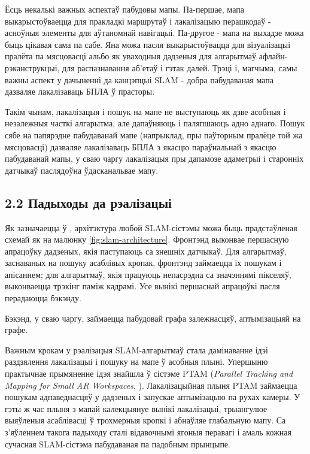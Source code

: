 Ёсць некалькі важных аспектаў пабудовы мапы. Па-першае, мапа выкарыстоўваецца для пракладкі
маршрутаў і лакалізацыю перашкодаў - асноўныя элементы для аўтаномнай навігацыі. Па-другое -
мапа на выхадзе можа быць цікавая сама па сабе. Яна можа пасля выкарыстоўвацца для візуалізацыі пралёта
па мясцовасці альбо як уваходныя дадзеныя для алгарытмаў афлайн-рэканструкцыі, для распазнавання
аб'етаў і гэтак далей. Трэці і, магчыма, самы важны аспект у дачыненні да канцэпцыі SLAM -
добра пабудаваная мапа дазваляе лакалізаваць БПЛА ў прасторы.

Такім чынам, лакалізацыя і пошук на мапе не выступаюць як дзве асобныя і незалежныя
часткі алгарытма, але дапаўняюць і паляпшаюць адно аднаго. Пошук сябе на папярэдне пабудаванай мапе
(напрыклад, пры паўторным пралёце той жа мясцовасці) дазваляе лакалізаваць БПЛА з
якасцю параўнальнай з якасцю пабудаванай мапы, у сваю чаргу лакалізацыя пры дапамозе
адаметрыі і старонніх датчыкаў паслядоўна ўдасканальвае мапу.

\subsection*{2.2 Падыходы да рэалізацыі}

Як зазначаецца ў \cite{Li2016RealtimeSL}, архітэктура любой SLAM-сістэмы
можа быць прадстаўленая схемай як на малюнку \ref{fig:slam-architecture}. Фронтэнд выконвае
першасную апрацоўку дадзеных, якія паступаюць са знешніх датчыкаў. Для алгарытмаў,
заснаваных на пошуку асаблівых кропак, фронтэнд займаецца іх пошукам і апісаннем;
для алгарытмаў, якія працуюць непасрэдна са значэннямі пікселяў, выконваецца трэкінг паміж
кадрамі. Усе вынікі першаснай апрацоўкі пасля перадаюцца бэкэнду.

Бэкэнд, у сваю чаргу, займаецца пабудовай графа залежнасцяў, аптымізацыяй на графе.

Важным крокам у рэалізацыя SLAM-алгарытмаў стала дамінаванне ідэі раздзялення лакалізацыі
і пошуку на мапе ў асобныя плыні. Упершыню практычнае прымяненне ідэя знайшла
ў сістэме PTAM (\textit{Parallel Tracking and Mapping for Small AR Workspaces}, \cite{Klein:2007:PTM:1514339.1514363}).
Лакалізацыйная плыня PTAM займаецца пошукам адпаведнасцяў у дадзеных і запускае
аптымізацыю па рухах камеры. У гэты ж час плыня з мапай калекцыянуе вынікі лакалізацыі,
трыангулюе выяўленыя асаблівасці ў трохмерныя кропкі і абнаўляе глабальную мапу.
Са з'яўленнем такога падыходу сталі відавочнымі ягоныя перавагі і амаль кожная
сучасная SLAM-сістэма пабудаваная па падобным прынцыпе.

